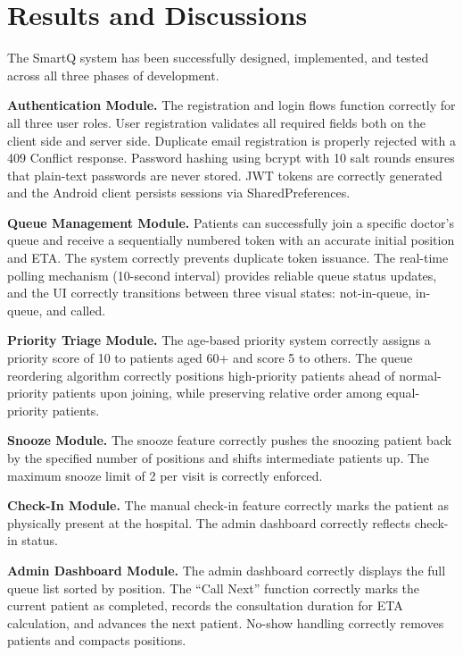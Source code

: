 \documentclass[12pt,a4paper]{article}
\begin{document}
\section{Results and Discussions}

The SmartQ system has been successfully designed, implemented, and tested across all three phases of development.

\textbf{Authentication Module.} The registration and login flows function correctly for all three user roles. User registration validates all required fields both on the client side and server side. Duplicate email registration is properly rejected with a 409 Conflict response. Password hashing using bcrypt with 10 salt rounds ensures that plain-text passwords are never stored. JWT tokens are correctly generated and the Android client persists sessions via SharedPreferences.

\textbf{Queue Management Module.} Patients can successfully join a specific doctor's queue and receive a sequentially numbered token with an accurate initial position and ETA. The system correctly prevents duplicate token issuance. The real-time polling mechanism (10-second interval) provides reliable queue status updates, and the UI correctly transitions between three visual states: not-in-queue, in-queue, and called.

\textbf{Priority Triage Module.} The age-based priority system correctly assigns a priority score of 10 to patients aged 60+ and score 5 to others. The queue reordering algorithm correctly positions high-priority patients ahead of normal-priority patients upon joining, while preserving relative order among equal-priority patients.

\textbf{Snooze Module.} The snooze feature correctly pushes the snoozing patient back by the specified number of positions and shifts intermediate patients up. The maximum snooze limit of 2 per visit is correctly enforced.

\textbf{Check-In Module.} The manual check-in feature correctly marks the patient as physically present at the hospital. The admin dashboard correctly reflects check-in status.

\textbf{Admin Dashboard Module.} The admin dashboard correctly displays the full queue list sorted by position. The ``Call Next'' function correctly marks the current patient as completed, records the consultation duration for ETA calculation, and advances the next patient. No-show handling correctly removes patients and compacts positions.
\end{document}
